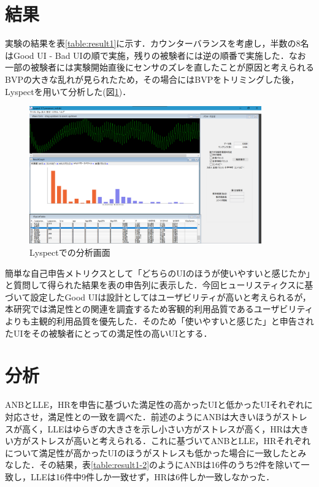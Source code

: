 \section{結果}

実験の結果を表\ref{table:result1}に示す．カウンターバランスを考慮し，半数の8名はGood  UI - Bad UIの順で実施，残りの被験者には逆の順番で実施した．なお一部の被験者には実験開始直後にセンサのズレを直したことが原因と考えられるBVPの大きな乱れが見られたため，その場合にはBVPをトリミングした後，Lyspectを用いて分析した(図\ref{fig:lyspect_analyze})．

\begin{figure}[htbp]
  \begin{minipage}{\hsize}
    \begin{center}
       \includegraphics[width=100mm]{img/lyspect_analyze}
    \end{center}
    \caption{Lyspectでの分析画面}
    \label{fig:lyspect_analyze}
  \end{minipage}
\end{figure}

簡単な自己申告メトリクスとして「どちらのUIのほうが使いやすいと感じたか」と質問して得られた結果を表の申告列に表示した．今回ヒューリスティクスに基づいて設定したGood UIは設計としてはユーザビリティが高いと考えられるが，本研究では満足性との関連を調査するため客観的利用品質であるユーザビリティよりも主観的利用品質を優先した．そのため「使いやすいと感じた」と申告されたUIをその被験者にとっての満足性の高いUIとする．

\section{分析}

ANBとLLE，HRを申告に基づいた満足性の高かったUIと低かったUIそれぞれに対応させ，満足性との一致を調べた．前述のようにANBは大きいほうがストレスが高く，LLEはゆらぎの大きさを示し小さい方がストレスが高く，HRは大きい方がストレスが高いと考えられる．これに基づいてANBとLLE，HRそれぞれについて満足性が高かったUIのほうがストレスも低かった場合に一致したとみなした．その結果，表\ref{table:result1-2}のようにANBは16件のうち2件を除いて一致し，LLEは16件中9件しか一致せず，HRは6件しか一致しなかった．

